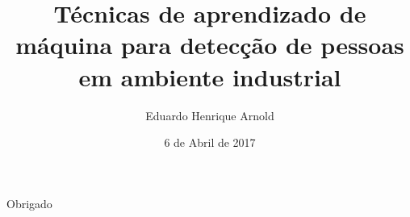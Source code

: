 \documentclass{beamer}
\title{Técnicas de aprendizado de máquina para detecção de pessoas em ambiente industrial}
\date{6 de Abril de 2017}
\author{Eduardo Henrique Arnold}
\institute{Universidade Federal de Santa Catarina}
\begin{document}
	\maketitle

	
	
	
	
	

	\begin{frame}[standout]
	  Obrigado
	\end{frame}
\end{document}
